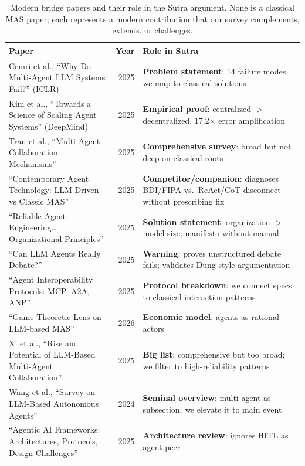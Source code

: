 \documentclass{article}
\begin{document}
\begin{table}[h]
\centering
\caption{Modern bridge papers and their role in the Sutra argument. None is a
classical MAS paper; each represents a modern contribution that our survey
complements, extends, or challenges.}
\label{tab:bridge-papers}
\footnotesize
\begin{tabular}{@{} p{4.5cm} r p{7cm} @{}}
\toprule
\textbf{Paper} & \textbf{Year} & \textbf{Role in Sutra} \\
\midrule
Cemri et al., ``Why Do Multi-Agent LLM Systems Fail?'' (ICLR) & 2025 & \textbf{Problem statement}: 14 failure modes we map to classical solutions \\
Kim et al., ``Towards a Science of Scaling Agent Systems'' (DeepMind) & 2025 & \textbf{Empirical proof}: centralized $>$ decentralized, 17.2$\times$ error amplification \\
Tran et al., ``Multi-Agent Collaboration Mechanisms'' & 2025 & \textbf{Comprehensive survey}: broad but not deep on classical roots \\
``Contemporary Agent Technology: LLM-Driven vs Classic MAS'' & 2025 & \textbf{Competitor/companion}: diagnoses BDI/FIPA vs.\ ReAct/CoT disconnect without prescribing fix \\
``Reliable Agent Engineering\ldots Organizational Principles'' & 2025 & \textbf{Solution statement}: organization $>$ model size; manifesto without manual \\
``Can LLM Agents Really Debate?'' & 2025 & \textbf{Warning}: proves unstructured debate fails; validates Dung-style argumentation \\
``Agent Interoperability Protocols: MCP, A2A, ANP'' & 2025 & \textbf{Protocol breakdown}: we connect specs to classical interaction patterns \\
``Game-Theoretic Lens on LLM-based MAS'' & 2026 & \textbf{Economic model}: agents as rational actors \\
Xi et al., ``Rise and Potential of LLM-Based Multi-Agent Collaboration'' & 2025 & \textbf{Big list}: comprehensive but too broad; we filter to high-reliability patterns \\
Wang et al., ``Survey on LLM-Based Autonomous Agents'' & 2024 & \textbf{Seminal overview}: multi-agent as subsection; we elevate it to main event \\
``Agentic AI Frameworks: Architectures, Protocols, Design Challenges'' & 2025 & \textbf{Architecture review}: ignores HITL as agent peer \\
\bottomrule
\end{tabular}
\end{table}
\end{document}
